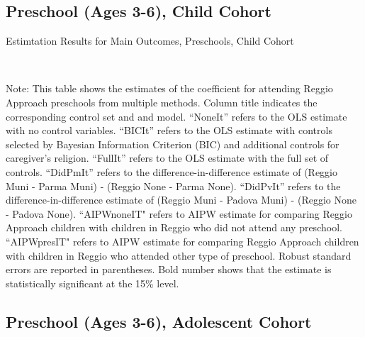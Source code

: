 


\subsection{Preschool (Ages 3-6), Child Cohort}

\begin{table}[H] \caption{Estimtation Results for Main Outcomes, Preschools, Child Cohort} \label{ols-M-child-reg}
\scalebox{1}{}
\vspace{1ex} \\
\footnotesize\raggedright{Note: This table shows the estimates of the coefficient for attending Reggio Approach preschools from multiple methods. Column title indicates the corresponding control set and and model. ``NoneIt'' refers to the OLS estimate with no control variables. ``BICIt'' refers to the OLS estimate with controls selected by Bayesian Information Criterion (BIC) and additional controls for caregiver's religion. ``FullIt'' refers to the OLS estimate with the full set of controls. ``DidPmIt'' refers to the difference-in-difference estimate of (Reggio Muni - Parma Muni) - (Reggio None - Parma None). ``DidPvIt'' refers to the difference-in-difference estimate of (Reggio Muni - Padova Muni) - (Reggio None - Padova None).  ``AIPWnoneIT" refers to AIPW estimate for comparing Reggio Approach children with children in Reggio who did not attend any preschool. ``AIPWpresIT" refers to AIPW estimate for comparing Reggio Approach children with children in Reggio who attended other type of preschool. Robust standard errors are reported in parentheses. Bold number shows that the estimate is statistically significant at the 15\% level.}

\end{table}






\subsection{Preschool (Ages 3-6), Adolescent Cohort}

